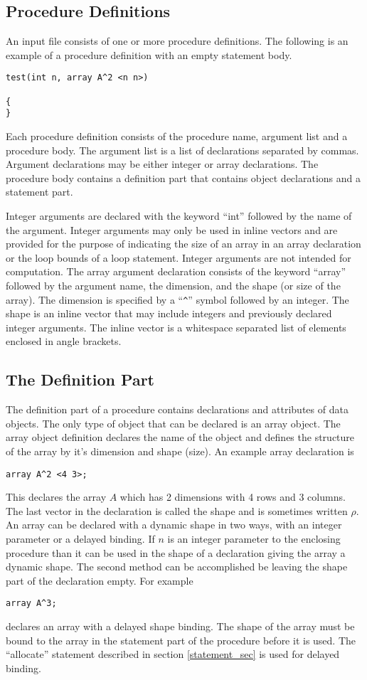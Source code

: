 \subsection{Procedure Definitions}
An input file consists of one or more procedure definitions.  The following
is an example of a procedure definition with an empty statement body.
\begin{verbatim}
test(int n, array A^2 <n n>)

{
}
\end{verbatim}

Each procedure
definition consists of the procedure name, argument list and a procedure
body.  The argument list is a list of declarations separated by commas.
Argument declarations may be either integer or array declarations.
The procedure body contains a definition part that contains object declarations
and a statement part.

Integer arguments are declared with the keyword ``int'' followed by the
name of the argument.  Integer arguments may only be used in inline vectors
and are provided for the purpose of indicating the size of an array
in an array declaration or the loop bounds of a loop statement.
Integer arguments are not intended for computation.
The array argument declaration consists of the keyword ``array'' followed by
the argument name, the dimension, and the shape (or size of the array).  
The dimension is
specified by a ``\verb+^+'' symbol followed by an integer.  The shape is an 
inline vector that may include integers and previously declared integer
arguments.  The inline vector is a whitespace separated list of elements 
enclosed in angle brackets.

\subsection{The Definition Part}
\label{def_sec}
The definition part of a procedure contains declarations and attributes of
data objects.
The only type of object that can be declared
is an array object.  The array object definition declares the name of the 
object and defines the structure of the array by it's dimension and shape 
(size).  An example array declaration is
\begin{verbatim}
array A^2 <4 3>;
\end{verbatim}
This declares the array $A$ which has 2 dimensions with 4 rows and
3 columns.  The last vector in the declaration is called the shape and
is sometimes written $\rho$.
An array can be declared with a dynamic shape in two ways, with
an integer parameter or a delayed binding.  If $n$ is an integer parameter
to the enclosing procedure than it can be used in the shape of a declaration
giving the array a dynamic shape.  The second method can be accomplished be
leaving the shape part of the declaration empty.  For example
\begin{verbatim}
array A^3;
\end{verbatim}
declares an array with a delayed shape binding.  The shape of the array
must be bound to the array in the statement part of the procedure before
it is used.  The ``allocate'' statement described in section 
\ref{statement_sec} is used for delayed binding.

